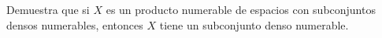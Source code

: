 
 \item Demuestra que si $X$ es un producto numerable de espacios con subconjuntos densos numerables, entonces $X$ tiene un subconjunto denso numerable.

   